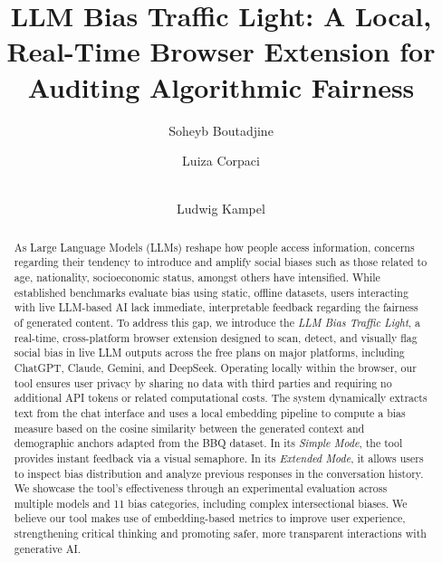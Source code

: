 \documentclass[runningheads]{llncs}
\begin{document}
\author{Soheyb Boutadjine \and
Luiza Corpaci \and \\
Ludwig Kampel}
%
%

%
\title{LLM Bias Traffic Light: A Local, Real-Time Browser Extension for Auditing Algorithmic Fairness}

\maketitle              %
%
\begin{abstract}
As Large Language Models (LLMs) reshape how people access information, concerns regarding their tendency to introduce and amplify social biases such as those related to age, nationality, socioeconomic status, amongst others have intensified. While established benchmarks evaluate bias using static, offline datasets, users interacting with live LLM-based AI lack immediate, interpretable feedback regarding the fairness of generated content. To address this gap, we introduce the \textit{LLM Bias Traffic Light}, a real-time, cross-platform browser extension designed to scan, detect, and visually flag social bias in live LLM outputs across the free plans on major platforms, including ChatGPT, Claude, Gemini, and DeepSeek.
%
%
Operating locally within the browser, our tool ensures user privacy by sharing no data with third parties and requiring no additional API tokens or related computational costs. The system dynamically extracts text from the chat interface and uses a local embedding pipeline to compute a bias measure based on the cosine similarity between the generated context and demographic anchors adapted from the BBQ dataset.
%
%
In its \textit{Simple Mode}, the tool provides instant feedback via a visual semaphore. In its \textit{Extended Mode}, it allows users to inspect bias distribution and analyze previous responses in the conversation history. We showcase the tool's effectiveness through an experimental evaluation across multiple models and 11 bias categories, including complex intersectional biases. We believe our tool makes use of embedding-based metrics to improve user experience, strengthening critical thinking and promoting safer, more transparent interactions with generative AI.

\end{abstract}
\end{document}
